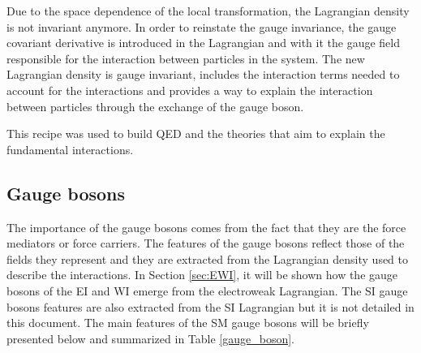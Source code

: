 Due to the space dependence of the local transformation, the Lagrangian density is not invariant anymore. In order to reinstate the gauge invariance, the gauge covariant derivative is introduced in the Lagrangian and with it the gauge field responsible for the interaction between particles in the system. The new Lagrangian density is gauge invariant, includes the interaction terms needed to account for the interactions and provides a way to explain the interaction between particles through the exchange of the gauge boson.

This recipe was used to build QED and the theories that aim to explain the fundamental interactions.   

\subsection{Gauge bosons}\label{sec:gb}

The importance of the gauge bosons comes from the fact that they are the force mediators or force carriers. The features of the gauge bosons reflect those of the fields they represent and they are extracted from the Lagrangian density used to describe the interactions. In Section \ref{sec:EWI}, it will be shown how the gauge bosons of the EI and WI emerge from the electroweak Lagrangian. The SI gauge bosons features are also extracted from the SI Lagrangian but it is not detailed in this document. The main features of the SM gauge bosons will be briefly presented below and summarized in Table \ref{gauge_boson}.

